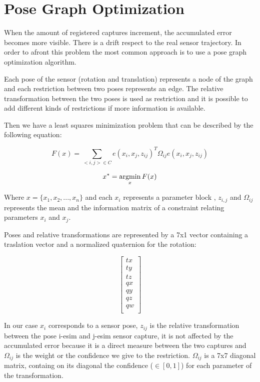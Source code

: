 \section{Pose Graph Optimization}

When the amount of registered captures increment, the accumulated error 
becomes more visible. There is a drift respect to the real sensor trajectory. 
In order to afront this problem the most common approach is to use a pose graph 
optimization algorithm. 

Each pose of the sensor (rotation and translation) represents a node of the 
graph and each restriction between two poses represents an edge. The relative 
transformation between the two poses is used as restriction and it is possible 
to add different kinds of restrictions if more information is available.

Then we have a least squares minimization problem that can be described by the following equation:

$$ F(x) = \sum\limits_{<i,j> \in C } e(x_i,x_j,z_{ij})^T \Omega_{ij} e(x_i,x_j,z_{ij}) $$

$$ x^* = \mathop{\rm argmin}_x F(x) $$

Where $x=\{x_1,x_2,...,x_n\}$ and each $x_i$ represents a parameter block , $z_{i,j}$ and $\Omega_{ij}$ represents the mean  
 and the information matrix  of a constraint 
relating parameters $x_i$ and $x_j$.

Poses and relative transformations are represented by a 7x1 vector containing a traslation vector
 and a normalized quaternion for the rotation:

$$ \begin{bmatrix}
tx \\
ty \\
tz \\
qx \\
qy \\
qz \\
qw \\
\end{bmatrix}
$$

In our case $x_i$ corresponds to a sensor pose, $z_{ij}$ is the 
relative transformation between the pose i-esim and j-esim sensor capture, it is not affected by the accumulated error 
because it is a direct measure between the two captures and $\Omega_{ij}$ is the weight or 
the confidence we give to the restriction. $\Omega_{ij}$ is a 7x7 diagonal matrix, containg on its diagonal the confidence ($\in [0,1]$) for each 
parameter of the transformation. 

